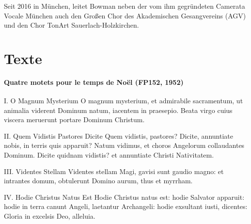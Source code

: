 \documentclass[11pt, ngermanm, titlepage]{article}
\begin{document}
\begin{multicols}{2}
	Seit 2016 in München, leitet Bowman neben der vom ihm gegründeten Camerata Vocale München auch den Großen Chor des Akademischen Gesangvereins (AGV) und den Chor TonArt Sauerlach-Holzkirchen.
	\vfill
	\pagebreak
	
	\section*{Texte}
	
	\paragraph{Quatre motets pour le temps de Noël (FP152, 1952)\newline}
	I. O Magnum Mysterium\newline
	O magnum mysterium,\newline
	et admirabile sacramentum,\newline
	ut animalia viderent Dominum natum,\newline
	iacentem in praesepio.\newline
	Beata virgo cuius viscera meruerunt\newline
	portare Dominum Christum.\newline
	
	II. Quem Vidistis Pastores Dicite\newline
	Quem vidistis, pastores? Dicite,\newline
	annuntiate nobis, in terris quis apparuit?\newline
	Natum vidimus,\newline
	et choros Angelorum collaudantes Dominum.\newline
	Dicite quidnam vidistis?\newline
	et annuntiate Christi Nativitatem.\newline
	
	III. Videntes Stellam\newline
	Videntes stellam Magi,\newline
	gavisi sunt gaudio magno:\newline
	et intrantes domum,\newline
	obtulerunt Domino aurum, thus et myrrham.\newline
	
	IV. Hodie Christus Natus Est\newline
	Hodie Christus natus est:\newline
	hodie Salvator apparuit:\newline
	hodie in terra canunt Angeli,\newline
	laetantur Archangeli:\newline
	hodie exsultant iusti, dicentes:\newline
	Gloria in excelsis Deo, alleluia.\newline
	

\end{multicols}
\end{document}
